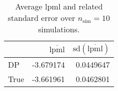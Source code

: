 \begin{table}[H]

\caption{Average lpml and related standard error over $n_{\text{sim}} = 10$ simulations.}
\centering
\begin{tabular}[t]{lrr}
\toprule
  & $\overbar{\text{lpml}}$ & $\text{sd}(\overbar{\text{lpml}})$\\
\midrule
DP & -3.679174 & 0.0449647\\
True & -3.661961 & 0.0462801\\
\bottomrule
\end{tabular}
\end{table}